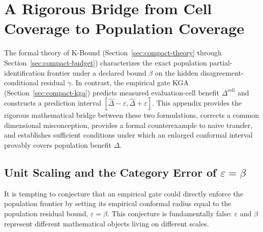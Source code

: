 \appendix
\providecommand{\KBMainRef}[3]{#2~\ref{#1}}
\providecommand{\KBMainEqRef}[2]{Eq.~\eqref{#1}}

\section{A Rigorous Bridge from Cell Coverage to Population Coverage}
\label{app:population-transfer}

The formal theory of K-Bound (\KBMainRef{sec:compact-theory}{Section}{the main theory section} through \KBMainRef{sec:compact-budget}{Section}{the main residual-budget section}) characterizes the
exact population partial-identification frontier under a declared bound $\beta$ on the hidden
disagreement-conditional residual $\gamma$. In contrast, the empirical gate KGA (\KBMainRef{sec:compact-kga}{Section}{the main KGA specification})
predicts measured evaluation-cell benefit $\Delta^{\mathrm{cell}}$ and constructs a prediction
interval $[\widehat\Delta-\varepsilon, \widehat\Delta+\varepsilon]$. This appendix provides the
rigorous mathematical bridge between these two formulations, corrects a common dimensional
misconception, provides a formal counterexample to naive transfer, and establishes sufficient
conditions under which an enlarged conformal interval provably covers population benefit $\Delta$.

\subsection{Unit Scaling and the Category Error of $\varepsilon = \beta$}
\label{app:unit-scaling}

It is tempting to conjecture that an empirical gate could directly enforce the population frontier
by setting its empirical conformal radius equal to the population residual bound, $\varepsilon = \beta$.
This conjecture is fundamentally false: $\varepsilon$ and $\beta$ represent different mathematical objects
living on different scales.

